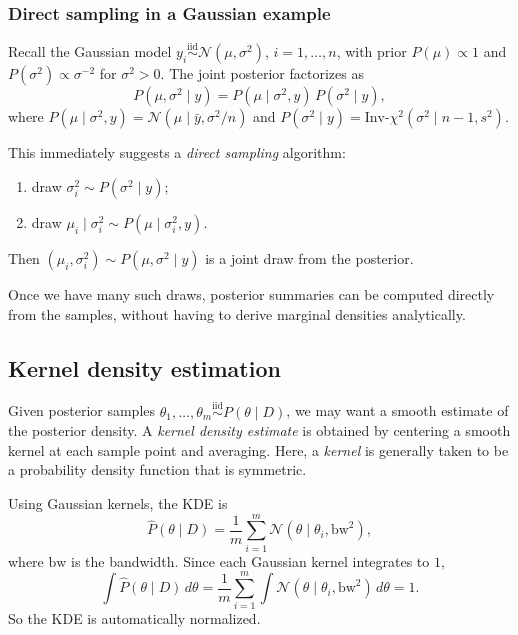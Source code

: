 \documentclass[11pt, titlepage]{article} %
\numberwithin{equation}{section}
\theoremstyle{definition}
\numberwithin{assumption}{section}
\begin{document}
\subsubsection*{Direct sampling in a Gaussian example}

Recall the Gaussian model
$y_i \overset{\mathrm{iid}}{\sim} \mathcal{N}(\mu,\sigma^2)$, $i=1,\dots,n$,
with prior $P(\mu)\propto 1$ and $P(\sigma^2)\propto \sigma^{-2}$ for $\sigma^2>0$. The joint posterior factorizes as
\begin{equation*}
    P(\mu,\sigma^2\mid y)=P(\mu\mid \sigma^2,y)\,P(\sigma^2\mid y),
\end{equation*}
where
$P(\mu\mid \sigma^2,y)=\mathcal{N}(\mu\mid \bar y,\sigma^2/n)$
and
$P(\sigma^2\mid y)=\mathrm{Inv}\text{-}\chi^2(\sigma^2\mid n-1,s^2)$.

This immediately suggests a \textit{direct sampling} algorithm:
\begin{enumerate}
    \item draw $\sigma_i^2 \sim P(\sigma^2\mid y)$;
    \item draw $\mu_i \mid \sigma_i^2 \sim P(\mu\mid \sigma_i^2,y)$.
\end{enumerate}
Then $(\mu_i,\sigma_i^2)\sim P(\mu,\sigma^2\mid y)$ is a joint draw from the posterior.

Once we have many such draws, posterior summaries can be computed directly from the samples, without having to derive marginal densities analytically. 


\subsection{Kernel density estimation}

Given posterior samples $\theta_1,\dots,\theta_m \overset{\mathrm{iid}}{\sim} P(\theta\mid D)$, we may want a smooth estimate of the posterior density. A \textit{kernel density estimate} is  obtained by centering a smooth kernel at each sample point and averaging. Here, a \textit{kernel} is generally taken to be a probability density function that is symmetric. 

Using Gaussian kernels, the KDE is
\begin{equation*}
    \hat P(\theta\mid D)
    =
    \frac{1}{m}\sum_{i=1}^m \mathcal{N}(\theta\mid \theta_i,\mathrm{bw}^2),
\end{equation*}
where $\mathrm{bw}$ is the bandwidth. Since each Gaussian kernel integrates to $1$,
\begin{equation*}
    \int \hat P(\theta\mid D)\,d\theta
    =
    \frac{1}{m}\sum_{i=1}^m \int \mathcal{N}(\theta\mid \theta_i,\mathrm{bw}^2)\,d\theta
    = 1.
\end{equation*}
So the KDE is automatically normalized.
\end{document}
